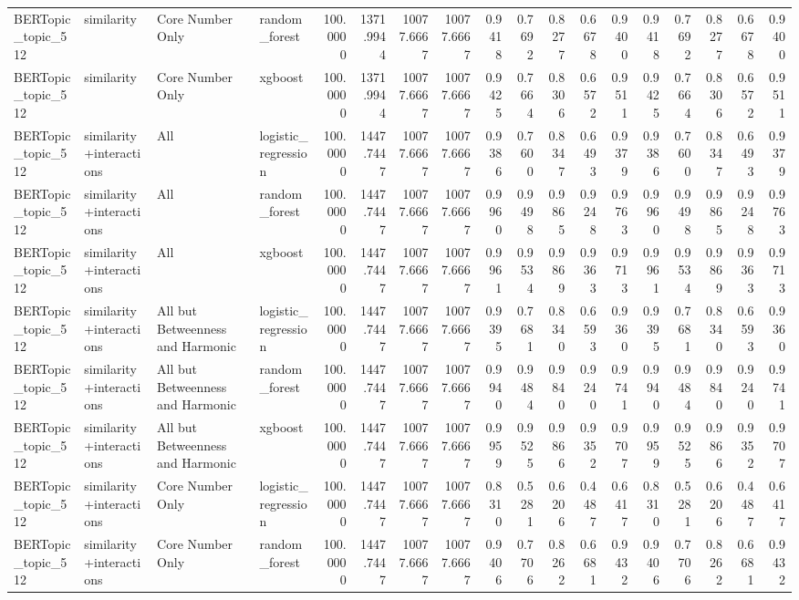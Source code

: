 \begin{tabular}{llllrrrrrrrrrrrrrr}
BERTopic_topic_512 & similarity & Core Number Only & random_forest & 100.0000 & 1371.9944 & 10077.6667 & 10077.6667 & 0.9418 & 0.7692 & 0.8277 & 0.6678 & 0.9400 & 0.9418 & 0.7692 & 0.8277 & 0.6678 & 0.9400 \\
BERTopic_topic_512 & similarity & Core Number Only & xgboost & 100.0000 & 1371.9944 & 10077.6667 & 10077.6667 & 0.9425 & 0.7664 & 0.8306 & 0.6572 & 0.9511 & 0.9425 & 0.7664 & 0.8306 & 0.6572 & 0.9511 \\
BERTopic_topic_512 & similarity+interactions & All & logistic_regression & 100.0000 & 1447.7447 & 10077.6667 & 10077.6667 & 0.9386 & 0.7600 & 0.8347 & 0.6493 & 0.9379 & 0.9386 & 0.7600 & 0.8347 & 0.6493 & 0.9379 \\
BERTopic_topic_512 & similarity+interactions & All & random_forest & 100.0000 & 1447.7447 & 10077.6667 & 10077.6667 & 0.9960 & 0.9498 & 0.9865 & 0.9248 & 0.9763 & 0.9960 & 0.9498 & 0.9865 & 0.9248 & 0.9763 \\
BERTopic_topic_512 & similarity+interactions & All & xgboost & 100.0000 & 1447.7447 & 10077.6667 & 10077.6667 & 0.9961 & 0.9534 & 0.9869 & 0.9363 & 0.9713 & 0.9961 & 0.9534 & 0.9869 & 0.9363 & 0.9713 \\
BERTopic_topic_512 & similarity+interactions & All but Betweenness and Harmonic & logistic_regression & 100.0000 & 1447.7447 & 10077.6667 & 10077.6667 & 0.9395 & 0.7681 & 0.8340 & 0.6593 & 0.9360 & 0.9395 & 0.7681 & 0.8340 & 0.6593 & 0.9360 \\
BERTopic_topic_512 & similarity+interactions & All but Betweenness and Harmonic & random_forest & 100.0000 & 1447.7447 & 10077.6667 & 10077.6667 & 0.9940 & 0.9484 & 0.9840 & 0.9240 & 0.9741 & 0.9940 & 0.9484 & 0.9840 & 0.9240 & 0.9741 \\
BERTopic_topic_512 & similarity+interactions & All but Betweenness and Harmonic & xgboost & 100.0000 & 1447.7447 & 10077.6667 & 10077.6667 & 0.9959 & 0.9525 & 0.9866 & 0.9352 & 0.9707 & 0.9959 & 0.9525 & 0.9866 & 0.9352 & 0.9707 \\
BERTopic_topic_512 & similarity+interactions & Core Number Only & logistic_regression & 100.0000 & 1447.7447 & 10077.6667 & 10077.6667 & 0.8310 & 0.5281 & 0.6206 & 0.4487 & 0.6417 & 0.8310 & 0.5281 & 0.6206 & 0.4487 & 0.6417 \\
BERTopic_topic_512 & similarity+interactions & Core Number Only & random_forest & 100.0000 & 1447.7447 & 10077.6667 & 10077.6667 & 0.9406 & 0.7706 & 0.8262 & 0.6681 & 0.9432 & 0.9406 & 0.7706 & 0.8262 & 0.6681 & 0.9432 \\

\end{tabular}
